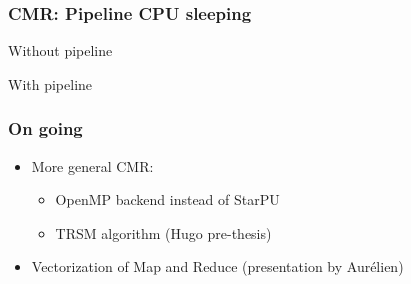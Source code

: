 \documentclass{beamer}
\begin{document}
\begin{frame}
    \frametitle{CMR: Pipeline CPU sleeping}

    \begin{minipage}[t][.5\textheight]{\textwidth}
        Without pipeline
        \begin{center}
            
        \end{center}
    \end{minipage}\par
    \begin{minipage}[t][.5\textheight]{\textwidth}
        With pipeline
        \begin{center}
            
        \end{center}
    \end{minipage}

\end{frame}

\begin{frame}
    \frametitle{On going}
    \begin{itemize}
        \item More general CMR:
              \begin{itemize}
                  \item OpenMP backend instead of StarPU
                  \item TRSM algorithm (Hugo pre-thesis)
              \end{itemize}
        \item Vectorization of Map and Reduce (presentation by Aurélien)
    \end{itemize}

\end{frame}
\end{document}
